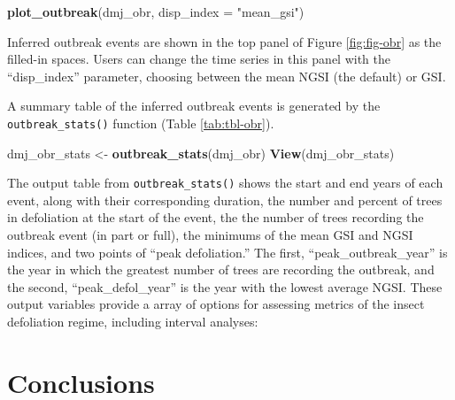\documentclass[review]{elsarticle} %
\newenvironment{Shaded}{\begin{snugshade}}{\end{snugshade}}
\newcommand{\CommentTok}[1]{\textcolor[rgb]{0.56,0.35,0.01}{\textit{#1}}}
\newcommand{\DataTypeTok}[1]{\textcolor[rgb]{0.13,0.29,0.53}{#1}}
\newcommand{\KeywordTok}[1]{\textcolor[rgb]{0.13,0.29,0.53}{\textbf{#1}}}
\newcommand{\NormalTok}[1]{#1}
\newcommand{\OperatorTok}[1]{\textcolor[rgb]{0.81,0.36,0.00}{\textbf{#1}}}
\newcommand{\StringTok}[1]{\textcolor[rgb]{0.31,0.60,0.02}{#1}}
\begin{document}
\begin{Shaded}
\begin{Highlighting}[]
\KeywordTok{plot_outbreak}\NormalTok{(dmj_obr, }\DataTypeTok{disp_index =} \StringTok{"mean_gsi"}\NormalTok{)}
\end{Highlighting}
\end{Shaded}

Inferred outbreak events are shown in the top panel of Figure \ref{fig:fig-obr} as the filled-in spaces. Users can change the time series in this panel with the ``disp\_index'' parameter, choosing between the mean NGSI (the default) or GSI.

A summary table of the inferred outbreak events is generated by the \texttt{outbreak\_stats()} function (Table \ref{tab:tbl-obr}).

\begin{Shaded}
\begin{Highlighting}[]
\NormalTok{dmj_obr_stats <-}\StringTok{ }\KeywordTok{outbreak_stats}\NormalTok{(dmj_obr)}
\KeywordTok{View}\NormalTok{(dmj_obr_stats)}
\end{Highlighting}
\end{Shaded}

The output table from \texttt{outbreak\_stats()} shows the start and end years of each event, along with their corresponding duration, the number and percent of trees in defoliation at the start of the event, the the number of trees recording the outbreak event (in part or full), the minimums of the mean GSI and NGSI indices, and two points of ``peak defoliation.'' The first, ``peak\_outbreak\_year'' is the year in which the greatest number of trees are recording the outbreak, and the second, ``peak\_defol\_year'' is the year with the lowest average NGSI. These output variables provide a array of options for assessing metrics of the insect defoliation regime, including interval analyses:

\begin{Shaded}
\end{Shaded}

\hypertarget{conclusions}{%
\section{Conclusions}\label{conclusions}}
\end{document}
